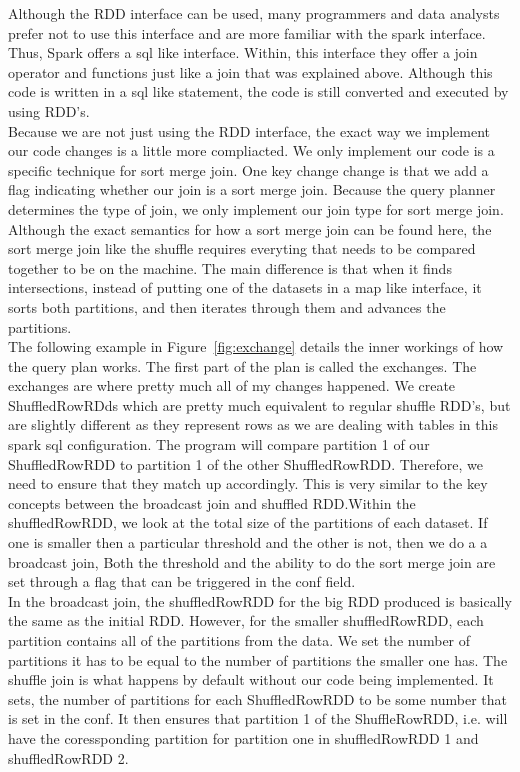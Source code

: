 Although the RDD interface can be used, many programmers and data analysts prefer not to use this interface
and are more familiar with the spark interface. Thus, Spark offers a sql like interface. Within, this interface
they offer a join operator and functions just like a join that was explained above. Although this code is written in a sql like statement,
the code is still converted and executed by using RDD's.\\

Because we are not just using the RDD interface, the exact way we implement our code changes is a 
little more compliacted. We only implement our code is a specific technique for sort merge join.
One key change change is that we add a flag indicating whether our join is a sort merge join. Because the query planner determines the type of join, we only implement our join type
for sort merge join.\\

Although the exact semantics for how a sort merge join can be found here,
the sort merge join like the shuffle requires everyting that needs to be compared together to be on the machine.
The main difference is that when it finds intersections, instead of putting one of the datasets in a map like interface,
it sorts both partitions, and then iterates through them and advances the partitions. \\

The following example in Figure~\ref{fig:exchange} details the inner workings
of how the query plan works. The first part of the plan is called the exchanges. 
The exchanges are where pretty much all of my changes happened. We create ShuffledRowRDds which
are pretty much equivalent to regular shuffle RDD's, but are slightly different as they represent
rows as we are dealing with tables in this spark sql configuration. The program will 
compare partition 1 of our ShuffledRowRDD to partition 1 of the other ShuffledRowRDD. Therefore,
we need to ensure that they match up accordingly. This is very similar to the key concepts between the
broadcast join and shuffled RDD.Within the shuffledRowRDD,
we look at the total size of the partitions of each dataset. If one is smaller then a particular
threshold and the other is not, then we do a a broadcast join,
Both the threshold and the ability to do the sort merge join are set through a flag that can be
triggered in the conf field.\\

In the broadcast join, the shuffledRowRDD for the big RDD  produced is basically
the same as the initial RDD. However, for the smaller shuffledRowRDD, each partition contains
all of the partitions from the data. We set the number of partitions it has to be equal to the number of partitions
the smaller one has. The shuffle join is what happens by default without our code being implemented. It sets,
the number of partitions for each ShuffledRowRDD to be some number that is set in the conf. It then ensures that partition 1 of 
the ShuffleRowRDD, i.e. will have the coressponding partition for partition one in shuffledRowRDD 1 and shuffledRowRDD 2. 

